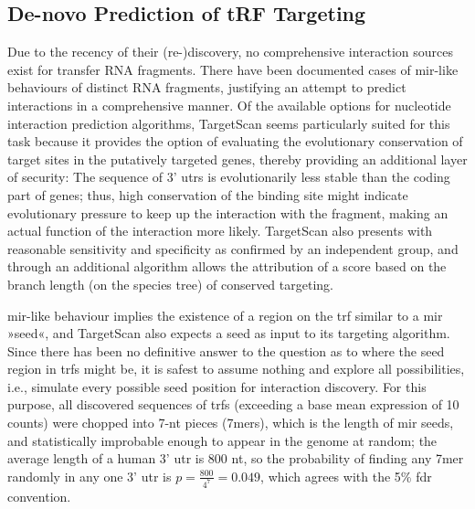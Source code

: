 \subsection{De-novo Prediction of tRF Targeting}
Due to the recency of their (re-)discovery, no comprehensive interaction sources exist for transfer RNA fragments. There have been documented cases of \ac{mir}-like behaviours of distinct RNA fragments,\cite{Cole2009,Kumar2014} justifying an attempt to predict interactions in a comprehensive manner. Of the available options for nucleotide interaction prediction algorithms, TargetScan\cite{Friedman2009} seems particularly suited for this task because it provides the option of evaluating the evolutionary conservation of target sites in the putatively targeted genes, thereby providing an additional layer of security: The sequence of 3' \acp{utr} is evolutionarily less stable than the coding part of genes; thus, high conservation of the binding site might indicate evolutionary pressure to keep up the interaction with the fragment, making an actual function of the interaction more likely. TargetScan also presents with reasonable sensitivity and specificity as confirmed by an independent group,\cite{Alexiou2009} and through an additional algorithm allows the attribution of a score based on the branch length (on the species tree) of conserved targeting.\cite{Agarwal2015}

\ac{mir}-like behaviour implies the existence of a region on the \ac{trf} similar to a \ac{mir} »seed«, and TargetScan also expects a seed as input to its targeting algorithm. Since there has been no definitive answer to the question as to where the seed region in \acp{trf} might be, it is safest to assume nothing and explore all possibilities, i.e., simulate every possible seed position for interaction discovery. For this purpose, all discovered sequences of \acp{trf} (exceeding a base mean expression of 10 counts) were chopped into 7-nt pieces (7mers), which is the length of \ac{mir} seeds, and statistically improbable enough to appear in the genome at random; the average length of a human 3' \ac{utr} is 800 \ac{nt}, so the probability of finding any 7mer randomly in any one 3' \ac{utr} is $p = \frac{800}{4^7} = 0.049$, which agrees with the 5\% \ac{fdr} convention.


